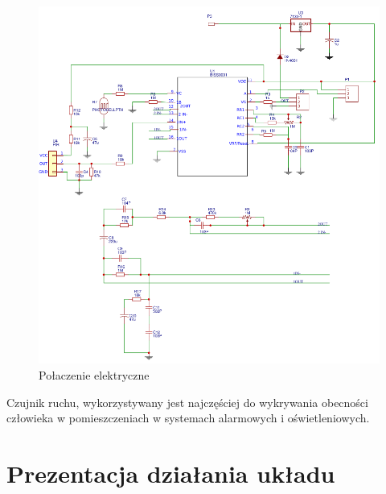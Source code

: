 \documentclass[11pt, a4paper]{article}
\begin{document}
\vspace{0.5cm}
\begin{figure}[h!]
    \centering
    \includegraphics[width=\linewidth]{fig/element/PIRkicad.png}
    \caption{Połaczenie elektryczne}
    \label{fig:my_label}
\end{figure}
\vspace{0.5cm}

Czujnik ruchu, wykorzystywany jest najczęściej do wykrywania obecności człowieka w pomieszczeniach w systemach alarmowych i oświetleniowych.

\newpage
\section{Prezentacja działania układu}
\end{document}
